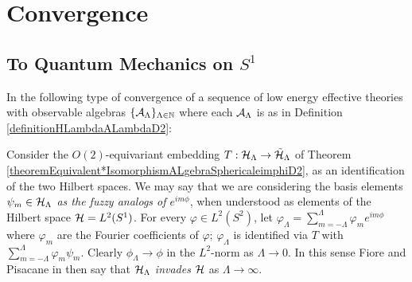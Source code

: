 \section{Convergence}

    
    
    
    
    


\subsection{To Quantum Mechanics on $S^1$}

In \cite{Fiore2018} the following type of convergence of a sequence of low energy effective theories with observable algebras $\{\mathcal A_\Lambda\}_{\Lambda \in \mathbb{N}}$ where each $\mathcal A_\Lambda$ is as in Definition \ref{definitionHLambdaALambdaD2}:

Consider the $O(2)$-equivariant embedding $T: \mathcal H_\Lambda \to \tilde {\mathcal H}_\Lambda$ of Theorem \ref{theoremEquivalent*IsomorphismALgebraSphericaleimphiD2}, as an identification of the two Hilbert spaces. We may say that we are considering the basis elements \emph{$\psi_m \in \mathcal H_\Lambda$ as the fuzzy analogs of $e^{im\phi}$}, when understood as elements of the Hilbert space $\mathcal H = L^2(S^1)$. For every $\varphi \in L^2(S^2)$, let $\varphi_\Lambda = \sum_{m = -\Lambda}^\Lambda \varphi_m e^{im\phi}$ where $\varphi_m$ are the Fourier coefficients of $\varphi$; $\varphi_\Lambda$ is identified via $T$ with $\sum_{m = -\Lambda}^\Lambda \varphi_m \psi_m$. Clearly $\phi_\Lambda \to \phi$ in the $L^2$-norm as $\Lambda \to 0$. In this sense Fiore and Pisacane in \cite{Fiore2018} then say that $\mathcal H_\Lambda$ \emph{invades} $\mathcal H$ as $\Lambda \to \infty$. 

